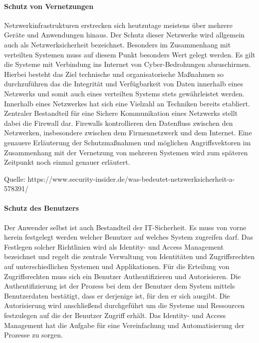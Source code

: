\documentclass[utf8,biblatex]{lni}
\begin{document}
\paragraph{Schutz von Vernetzungen}
Netzwerkinfrastrukturen erstrecken sich heutzutage meistens über mehrere Geräte und Anwendungen hinaus. Der Schutz dieser 
Netzwerke wird allgemein auch als Netzwerksicherheit bezeichnet. Besonders im Zusammenhang mit verteilten Systemen muss auf diesem Punkt besonders Wert gelegt werden.
Es gilt die Systeme mit Verbindung ins Internet von Cyber-Bedrohungen abzuschirmen. Hierbei besteht das Ziel technische und organisatorische 
Maßnahmen so durchzuführen das die Integrität und Verfügbarkeit von Daten innerhalb eines Netzwerks und somit auch eines verteilten Systems stets gewährleistet werden. 
Innerhalb eines Netzwerkes hat sich eine Vielzahl an Techniken bereits etabliert. 
Zentraler Bestandteil für eine Sichere Kommunikation eines Netzwerks stellt dabei die Firewall dar. Firewalls kontrollieren den Datenfluss zwischen den 
Netzwerken, insbesondere zwischen dem Firmennetzwerk und dem Internet. Eine genauere Erläuterung der Schutzmaßnahmen und möglichen Angriffsvektoren im Zusammenhang mit 
der Vernetzung von mehreren Systemen wird zum späteren Zeitpunkt noch einmal genauer erläutert. 

Quelle: https://www.security-insider.de/was-bedeutet-netzwerksicherheit-a-578391/

\paragraph{Schutz des Benutzers}\label{Schutz_des_Benutzers}
Der Anwender selbst ist auch Bestandteil der IT-Sicherheit. Es muss von vorne herein festgelegt werden welcher Benutzer auf welches System zugreifen darf. 
Das Festlegen solcher Richtlinien wird als \glqq Identity- und Access Management \grqq{} bezeichnet und regelt die zentrale Verwaltung von Identitäten und Zugriffsrechten auf unterschiedlichen
Systemen und Applikationen. Für die Erteilung von Zugriffsrechten muss sich ein Benutzer Authentifizieren und Autorisieren. 
Die Authentifizierung ist der Prozess bei dem der Benutzer dem System mittels Benutzerdaten bestätigt, dass er derjenige ist, für den er sich ausgibt. Die Autorisierung 
wird anschließend durchgeführt um die Systeme und Ressourcen festzulegen auf die der Benutzer Zugriff erhält. Das Identity- und Access Management hat die 
Aufgabe für eine Vereinfachung und Automatisierung der Prozesse zu sorgen. 
\end{document}
